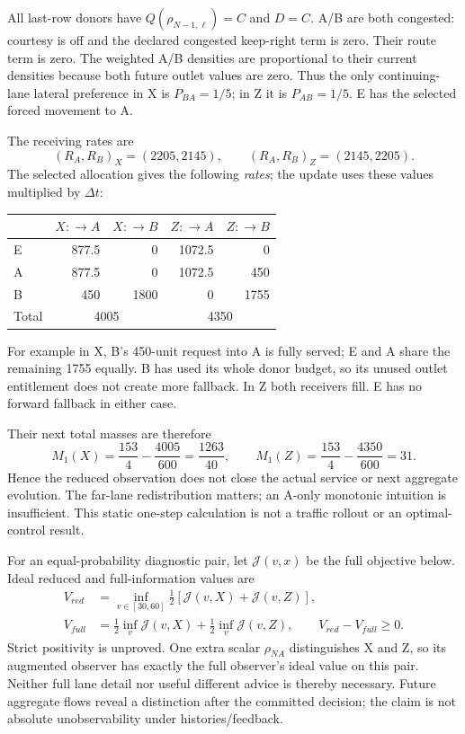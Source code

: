 \documentclass[10pt,a4paper]{article}
\begin{document}
All last-row donors have $Q(\rho_{N-1,\ell})=C$ and $D=C$. A/B are both
congested: courtesy is off and the declared congested keep-right term is
zero. Their route term is zero. The weighted A/B densities are proportional
to their current densities because both future outlet values are zero.
Thus the only continuing-lane lateral preference in X is $P_{BA}=1/5$;
in Z it is $P_{AB}=1/5$. E has the selected forced movement to A.

The receiving rates are
\begin{equation}
 (R_A,R_B)_X=(2205,2145),\qquad (R_A,R_B)_Z=(2145,2205).
\end{equation}
The selected allocation gives the following \emph{rates}; the update uses
these values multiplied by $\Delta t$:
\begin{center}
\begin{tabular}{lrrrr}
\toprule
 & $X:\to A$ & $X:\to B$ & $Z:\to A$ & $Z:\to B$\\
\midrule
E & 877.5 & 0 & 1072.5 & 0\\
A & 877.5 & 0 & 1072.5 & 450\\
B & 450 & 1800 & 0 & 1755\\
\midrule
Total & \multicolumn{2}{c}{4005} & \multicolumn{2}{c}{4350}\\
\bottomrule
\end{tabular}
\end{center}
For example in X, B's 450-unit request into A is fully served; E and A
share the remaining 1755 equally. B has used its whole donor budget, so
its unused outlet entitlement does not create more fallback. In Z both
receivers fill. E has no forward fallback in either case.

Their next total masses are therefore
\begin{equation}
 M_1(X)=\frac{153}{4}-\frac{4005}{600}=\frac{1263}{40},\qquad
 M_1(Z)=\frac{153}{4}-\frac{4350}{600}=31. \label{eq:nextmass}
\end{equation}
Hence the reduced observation does not close the actual service or next
aggregate evolution. The far-lane redistribution matters; an A-only monotonic
intuition is insufficient. This static one-step calculation is not a traffic
rollout or an optimal-control result.

For an equal-probability diagnostic pair, let $\mathcal J(v,x)$ be the full
objective below. Ideal reduced and full-information values are
\begin{align}
 V_{red}&=\inf_{v\in[30,60]}\tfrac12[\mathcal J(v,X)+\mathcal J(v,Z)],\nonumber\\
 V_{full}&=\tfrac12\inf_v\mathcal J(v,X)+\tfrac12\inf_v\mathcal J(v,Z),
 \qquad V_{red}-V_{full}\geq0. \label{eq:infovalue}
\end{align}
Strict positivity is unproved. One extra scalar $\rho_{NA}$ distinguishes X
and Z, so its augmented observer has exactly the full observer's ideal value
on this pair. Neither full lane detail nor useful different advice is thereby
necessary. Future aggregate flows reveal a distinction after the committed
decision; the claim is not absolute unobservability under histories/feedback.
\end{document}
